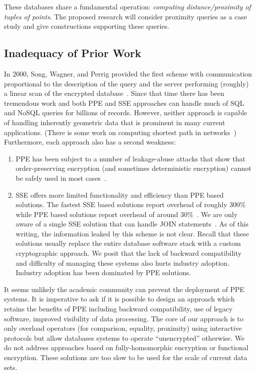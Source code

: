 These databases share a fundamental operation: {\em
computing distance/proximity of tuples of points}. The proposed research will
consider proximity queries as a case study and give constructions supporting
these queries. 


\subsection{Inadequacy of Prior Work}

In 2000, Song, Wagner, and Perrig provided the first scheme with communication proportional to the description of the query and the server performing (roughly) a linear scan of the encrypted database~\cite{SP:SonWagPer00}.  Since that time there has been tremendous work and both PPE and SSE approaches can handle much of SQL and NoSQL queries for billions of records.  However, neither approach is capable of handling inherently geometric data that is prominent in many current applications. (There is some work on computing shortest path in networks~\cite{CCS:MKNK15})  Furthermore, each approach also has a second weakness:
\begin{enumerate}
\item PPE has been subject to a number of leakage-abuse attacks that show that order-preserving encryption (and sometimes deterministic encryption) cannot be safely used in most cases~\cite{CCS:NavKamWri15,CCS:CGPR15,CCS:KKNO16,CCS:PouWri16,CCS:GMNRS16,EPRINT:GSBNR16,EPRINT:ZhaKatPap16}.
\item SSE offers more limited functionality and efficiency than PPE based solutions.  The fastest SSE based solutions report overhead of roughly 300\%~\cite{C:CJJKRS13,CCS:JJKRS13,NDSS:CJJJKR14,ESORICS:FJKNRS15} while PPE based solutions report overhead of around 30\%~\cite{CACM:PRZB12}.  We are only aware of a single SSE solution that can handle JOIN statements~\cite{EPRINT:KamMoa16}.  As of this writing, the information  leaked by this scheme is not clear.  Recall that these solutions usually replace the entire database software stack with a custom cryptographic approach.  We posit that the lack of backward compatibility and difficulty of managing these systems also hurts industry adoption.  Industry adoption has been dominated by PPE solutions.
\end{enumerate}

It seems unlikely the academic community can prevent the deployment of PPE systems.  It is imperative to ask if it is possible to design an approach which retains the benefits of PPE including backward compatibility, use of legacy software, improved visibility of data processing.  The core of our approach is to only overload operators (for comparison, equality, proximity) using interactive protocols but allow databases systems to operate ``unencrypted'' otherwise.  
We do not address approaches based on fully-homomorphic encryption or functional encryption.  These solutions are too slow to be used for the scale of current data sets.


